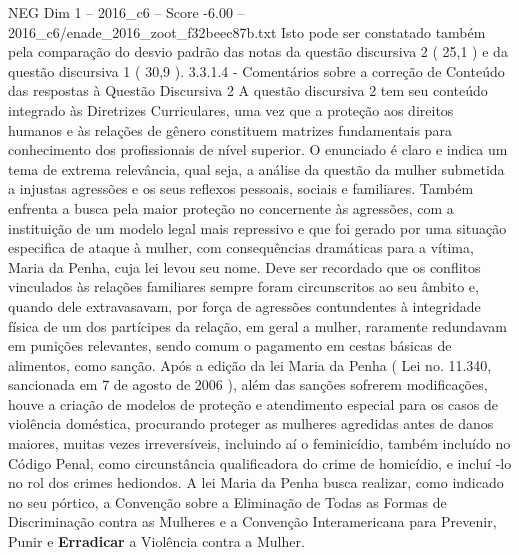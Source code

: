 \begin{textsample}{NEG Dim 1 – 2016\_c6 – Score -6.00 – 2016\_c6/enade\_2016\_zoot\_f32beec87b.txt}
Isto pode ser constatado também pela comparação do desvio padrão das notas da questão discursiva 2 ( 25,1 ) e da questão discursiva 1 ( 30,9 ). 3.3.1.4 - Comentários sobre a correção de Conteúdo das respostas à Questão Discursiva 2 A questão discursiva 2 tem seu conteúdo integrado às Diretrizes Curriculares, uma vez que a proteção aos direitos humanos e às relações de gênero constituem matrizes fundamentais para conhecimento dos profissionais de nível superior.
O enunciado é claro e indica um tema de extrema relevância, qual seja, a análise da questão da mulher submetida a injustas agressões e os seus reflexos pessoais, sociais e familiares.
Também enfrenta a busca pela maior proteção no concernente às agressões, com a instituição de um modelo legal mais repressivo e que foi gerado por uma situação especifica de ataque à mulher, com consequências dramáticas para a vítima, Maria da Penha, cuja lei levou seu nome.
Deve ser recordado que os conflitos vinculados às relações familiares sempre foram circunscritos ao seu âmbito e, quando dele extravasavam, por força de agressões contundentes à integridade física de um dos partícipes da relação, em geral a mulher, raramente redundavam em punições relevantes, sendo comum o pagamento em cestas básicas de alimentos, como sanção.
Após a edição da lei Maria da Penha ( Lei no. 11.340, sancionada em 7 de agosto de 2006 ), além das sanções sofrerem modificações, houve a criação de modelos de proteção e atendimento especial para os casos de violência doméstica, procurando proteger as mulheres agredidas antes de danos maiores, muitas vezes irreversíveis, incluindo aí o feminicídio, também incluído no Código Penal, como circunstância qualificadora do crime de homicídio, e incluí -lo no rol dos crimes hediondos.
A lei Maria da Penha busca realizar, como indicado no seu pórtico, a Convenção sobre a Eliminação de Todas as Formas de Discriminação contra as Mulheres e a Convenção Interamericana para Prevenir, Punir e \textbf{Erradicar} a Violência contra a Mulher.

\end{textsample}

